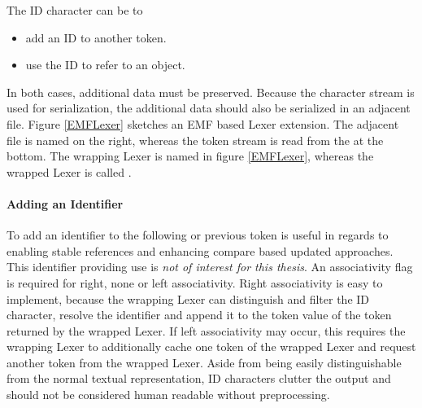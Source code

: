 The ID character can be to
\begin{itemize}
	\item add an ID to another token.
	\item use the ID to refer to an object.
\end{itemize}
In both cases, additional data must be preserved. Because the character stream is used for serialization, the additional data should also be serialized in an adjacent file. Figure \ref{EMFLexer} sketches an EMF based Lexer extension. The adjacent file is named  on the right, whereas the token stream is read from the  at the bottom. The wrapping Lexer is named  in figure \ref{EMFLexer}, whereas the wrapped Lexer is called .  

\paragraph{Adding an Identifier} To add an identifier to the following or previous token is useful in regards to enabling stable references and enhancing compare based updated approaches. This identifier providing use is \emph{not of interest for this thesis}. An associativity flag is required for right, none or left associativity.  Right associativity is easy to implement, because the wrapping Lexer can distinguish and filter the ID character, resolve the identifier and append it to the token value of the token returned by the wrapped Lexer. If left associativity may occur, this requires the wrapping Lexer to additionally cache one token of the wrapped Lexer and request another token from the wrapped Lexer. Aside from being easily distinguishable from the normal textual representation, ID characters clutter the output and should not be considered human readable without preprocessing. 
 
